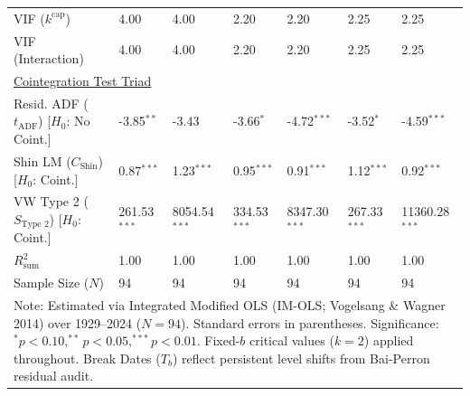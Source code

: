 \begin{table}[H]
\begin{tabular}{p{3.8cm}p{1.35cm}p{1.35cm}p{1.35cm}p{1.35cm}p{1.35cm}p{1.35cm}}
VIF ($k^{\text{cap}}$) & 4.00 & 4.00 & 2.20 & 2.20 & 2.25 & 2.25  \\
VIF (Interaction) & 4.00 & 4.00 & 2.20 & 2.20 & 2.25 & 2.25  \\
\midrule
\multicolumn{7}{l}{\underline{Cointegration Test Triad}} \\
\makecell[l]{Resid. ADF ($t_{\text{ADF}}$) \\ {\scriptsize [$H_0$: No Coint.]}} & -3.85$^{**}$ & -3.43 & -3.66$^{*}$ & -4.72$^{***}$ & -3.52$^{*}$ & -4.59$^{***}$  \\
\makecell[l]{Shin LM ($C_{\text{Shin}}$) \\ {\scriptsize [$H_0$: Coint.]}} & 0.87$^{***}$ & 1.23$^{***}$ & 0.95$^{***}$ & 0.91$^{***}$ & 1.12$^{***}$ & 0.92$^{***}$  \\
\makecell[l]{VW Type 2 ($S_{\text{Type 2}}$) \\ {\scriptsize [$H_0$: Coint.]}} & 261.53$^{***}$ & 8054.54$^{***}$ & 334.53$^{***}$ & 8347.30$^{***}$ & 267.33$^{***}$ & 11360.28$^{***}$  \\
\midrule
$R^2_{\text{sum}}$ & 1.00 & 1.00 & 1.00 & 1.00 & 1.00 & 1.00  \\
Sample Size ($N$) & 94 & 94 & 94 & 94 & 94 & 94  \\
\bottomrule
\multicolumn{7}{p{13.2cm}}{\footnotesize Note: Estimated via Integrated Modified OLS (IM-OLS; Vogelsang \& Wagner 2014) over 1929--2024 ($N=94$). Standard errors in parentheses. Significance: $^*p<0.10, ^{**}p<0.05, ^{***}p<0.01$. Fixed-$b$ critical values ($k=2$) applied throughout. Break Dates ($T_b$) reflect persistent level shifts from Bai-Perron residual audit.}
\end{tabular}
\end{table}
